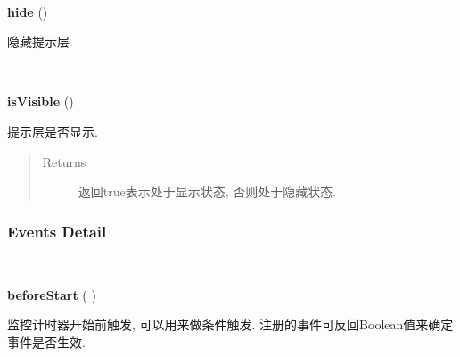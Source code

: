 \documentclass[letterpaper,10pt,english]{sphinxmanual}
\begin{document}

\begin{fulllineitems}
\label{api/component/suggest/index:Suggest.hide}~
\begin{DUlineblock}{0em}
\item[] \textbf{hide} ()
\item[] 隐藏提示层.
\end{DUlineblock}

\end{fulllineitems}



\begin{fulllineitems}
\label{api/component/suggest/index:Suggest.isVisible}~
\begin{DUlineblock}{0em}
\item[] \textbf{isVisible} ()
\item[] 提示层是否显示.
\end{DUlineblock}
\begin{quote}\begin{description}
\item[{Returns}] \leavevmode
返回true表示处于显示状态, 否则处于隐藏状态.

\end{description}\end{quote}

\end{fulllineitems}



\subsubsection{Events Detail}
\label{api/component/suggest/index:events-detail}

\begin{fulllineitems}
\label{api/component/suggest/index:Suggest.beforeStart}~
\begin{DUlineblock}{0em}
\item[] \textbf{beforeStart} ( )
\item[] 监控计时器开始前触发, 可以用来做条件触发. 注册的事件可反回Boolean值来确定事件是否生效.
\end{DUlineblock}

\end{fulllineitems}
\end{document}
